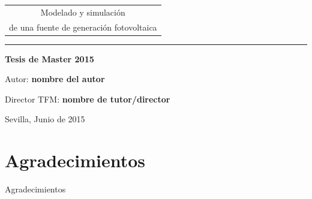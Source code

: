 \documentclass[11pt,a4paper,twoside,titlepage]{book}
\renewcommand{\listtablename}{Índice de tablas}
\renewcommand{\tablename}{Tabla}
\renewcommand{\thepage}{\roman{page}}
\begin{document}
\begin{titlepage}
\begin{center}
{		\begin{tabular}{c}
			\hspace*{-0.22cm} Modelado y simulación \\ de una fuente de generación fotovoltaica    \\

		\end{tabular}}
	
		\vspace*{0.5cm}
		\noindent \rule{\textwidth}{0.5pt}%
		\vspace*{2.0cm}
	
		{\Large\bf Tesis de Master 2015}
	
	
	
		\vspace*{0.3cm}
		{\large Autor:}
		\vspace*{0.5cm}
		{\large\bf nombre del autor} \vspace*{0.5cm}
	
	\vspace*{0.3cm}
		{\large Director TFM:}
		\vspace*{0.5cm}
		{\large\bf  nombre de tutor/director } \vspace*{0.5cm}
		
		\vspace*{2cm} {\large Sevilla, Junio de 2015}
	\end{center}
\end{titlepage}
 
 
 
\chapter*{Agradecimientos}
Agradecimientos


\thispagestyle{empty}

\tableofcontents
\listoftables
\listoffigures


\renewcommand{\listtablename}{Índice de tablas}
\renewcommand{\tablename}{Tabla}


\newpage
\thispagestyle{empty}
\mbox{}


\renewcommand{\thepage}{\arabic{page}}
\setcounter{page}{1}





\end{document}
